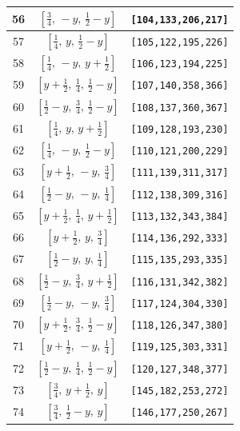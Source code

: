 \documentclass[fleqn,8pt]{jsarticle}
\begin{document}
\begin{longtable}{ccc}
56 & $\left[ \frac{3}{4},\, - y,\, \frac{1}{2} - y \right]$ & {\tt [104,133,206,217]} \\ \hline
57 & $\left[ \frac{1}{4},\, y,\, \frac{1}{2} - y \right]$ & {\tt [105,122,195,226]} \\ \hline
58 & $\left[ \frac{1}{4},\, - y,\, y + \frac{1}{2} \right]$ & {\tt [106,123,194,225]} \\ \hline
59 & $\left[ y + \frac{1}{2},\, \frac{1}{4},\, \frac{1}{2} - y \right]$ & {\tt [107,140,358,366]} \\ \hline
60 & $\left[ \frac{1}{2} - y,\, \frac{3}{4},\, \frac{1}{2} - y \right]$ & {\tt [108,137,360,367]} \\ \hline
61 & $\left[ \frac{1}{4},\, y,\, y + \frac{1}{2} \right]$ & {\tt [109,128,193,230]} \\ \hline
62 & $\left[ \frac{1}{4},\, - y,\, \frac{1}{2} - y \right]$ & {\tt [110,121,200,229]} \\ \hline
63 & $\left[ y + \frac{1}{2},\, - y,\, \frac{3}{4} \right]$ & {\tt [111,139,311,317]} \\ \hline
64 & $\left[ \frac{1}{2} - y,\, - y,\, \frac{1}{4} \right]$ & {\tt [112,138,309,316]} \\ \hline
65 & $\left[ y + \frac{1}{2},\, \frac{1}{4},\, y + \frac{1}{2} \right]$ & {\tt [113,132,343,384]} \\ \hline
66 & $\left[ y + \frac{1}{2},\, y,\, \frac{3}{4} \right]$ & {\tt [114,136,292,333]} \\ \hline
67 & $\left[ \frac{1}{2} - y,\, y,\, \frac{1}{4} \right]$ & {\tt [115,135,293,335]} \\ \hline
68 & $\left[ \frac{1}{2} - y,\, \frac{3}{4},\, y + \frac{1}{2} \right]$ & {\tt [116,131,342,382]} \\ \hline
69 & $\left[ \frac{1}{2} - y,\, - y,\, \frac{3}{4} \right]$ & {\tt [117,124,304,330]} \\ \hline
70 & $\left[ y + \frac{1}{2},\, \frac{3}{4},\, \frac{1}{2} - y \right]$ & {\tt [118,126,347,380]} \\ \hline
71 & $\left[ y + \frac{1}{2},\, - y,\, \frac{1}{4} \right]$ & {\tt [119,125,303,331]} \\ \hline
72 & $\left[ \frac{1}{2} - y,\, \frac{1}{4},\, \frac{1}{2} - y \right]$ & {\tt [120,127,348,377]} \\ \hline
73 & $\left[ \frac{3}{4},\, y + \frac{1}{2},\, y \right]$ & {\tt [145,182,253,272]} \\ \hline
74 & $\left[ \frac{3}{4},\, \frac{1}{2} - y,\, y \right]$ & {\tt [146,177,250,267]} \\ \hline

\end{longtable}
\end{document}
